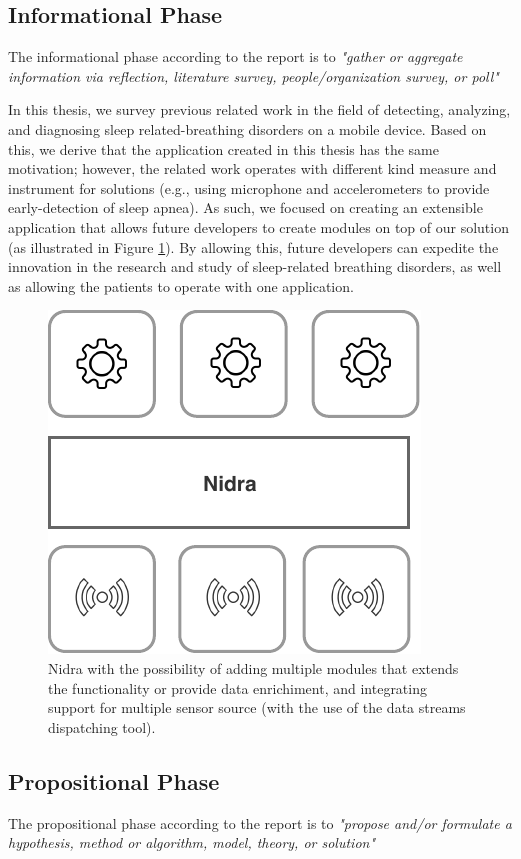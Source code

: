 \subsection{Informational Phase}
The informational phase according to the report is to \textit{"gather or aggregate information via reflection, literature survey, people/organization survey, or poll"}

In this thesis, we survey previous related work in the field of detecting, analyzing, and diagnosing sleep related-breathing disorders on a mobile device. Based on this, we derive that the application created in this thesis has the same motivation; however, the related work operates with different kind measure and instrument for solutions (e.g., using microphone and accelerometers to provide early-detection of sleep apnea). As such, we focused on creating an extensible application that allows future developers to create modules on top of our solution (as illustrated in Figure \ref{fig:nidra_modules}). By allowing this, future developers can expedite the innovation in the research and study of sleep-related breathing disorders, as well as allowing the patients to operate with one application. 

\begin{figure}
    \centering
    \includegraphics[scale=0.9]{images/Nidram2.pdf}
    \caption{Nidra with the possibility of adding multiple modules that extends the functionality or provide data enrichiment, and integrating support for multiple sensor source (with the use of the data streams dispatching tool).}
    \label{fig:nidra_modules}
\end{figure}

\subsection{Propositional Phase}
The propositional phase according to the report is to \textit{"propose and/or formulate a hypothesis, method or algorithm, model, theory, or solution"}


